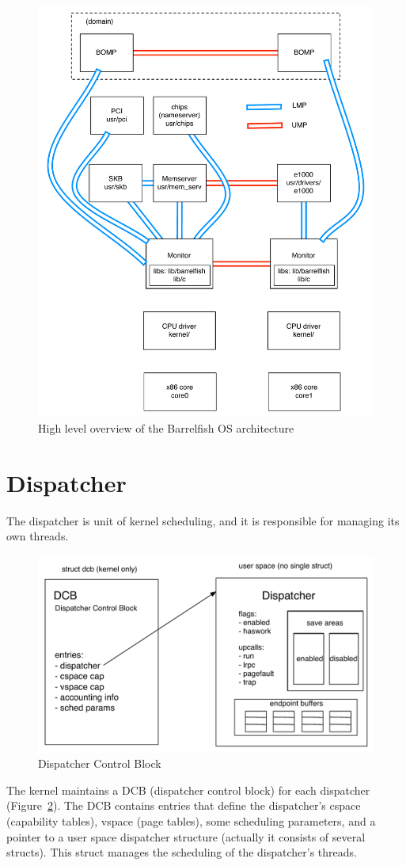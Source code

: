 \documentclass[a4paper,twoside]{report} %
\begin{document}
\begin{figure}[hbt]
 \begin{center}
 \includegraphics[width=0.5\columnwidth]{os-arch.pdf}
 \end{center}
 \caption{High level overview of the Barrelfish OS architecture}\label{fig:os-arch}
\end{figure}


\section{Dispatcher}
The dispatcher is unit of kernel scheduling, and it is responsible for managing
its own threads.

\begin{figure}[hbt]
 \begin{center}
 \includegraphics[width=0.5\columnwidth]{dcb.pdf}
 \end{center}
 \caption{Dispatcher Control Block}\label{fig:dcb}
\end{figure}

The kernel maintains a DCB (dispatcher control block) for each dispatcher
(Figure~\ref{fig:dcb}). The DCB contains entries that define the dispatcher's
cspace (capability tables), vspace (page tables), some scheduling parameters,
and a pointer to a user space dispatcher structure (actually it consists of
several structs). This struct manages the scheduling of the dispatcher's
threads.
\end{document}
